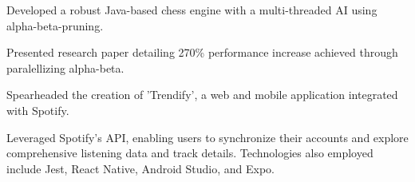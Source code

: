 \documentclass[]{deedy-resume-openfont}
\begin{document}
\descript{}
\begin{tightemize}
\item Developed a robust Java-based chess engine with a multi-threaded AI using alpha-beta-pruning. 
\item Presented research paper detailing 270\% performance increase achieved through paralellizing alpha-beta.
\end{tightemize}
\sectionsep

\descript{}
\begin{tightemize}
\item Spearheaded the creation of 'Trendify', a web and mobile application integrated with Spotify.
\item Leveraged Spotify's API, enabling users to synchronize their accounts and explore comprehensive listening data and track details. Technologies also employed include Jest, React Native, Android Studio, and Expo.
\end{tightemize}





\sectionsep\
\hfill
\vfill\eject
\end{document}
